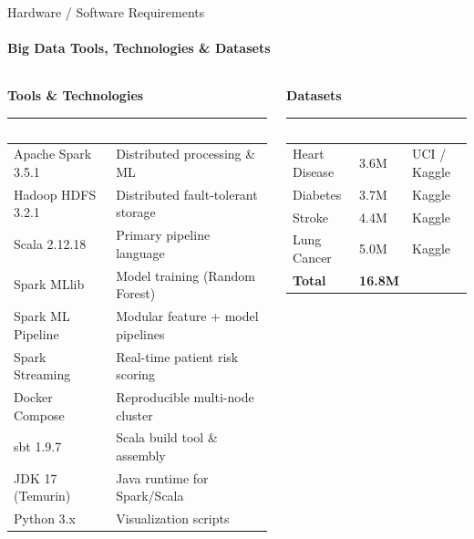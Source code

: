 \documentclass[aspectratio=169, 11pt]{beamer}
\begin{document}
\begin{frame}{Hardware / Software Requirements}
\framesubtitle{Big Data Tools, Technologies \& Datasets}

\vspace{0.15cm}
\begin{columns}[T]
\begin{column}{0.52\textwidth}
  {\small\textbf{\textcolor{msNavy}{Tools \& Technologies}}}

  \vspace{0.15cm}
  \renewcommand{\arraystretch}{1.2}
  {\scriptsize
  \begin{tabular}{@{} L{2.6cm} L{3.8cm} @{}}
    \toprule
    \textcolor{white}{\textbf{Tool}} & \textcolor{white}{\textbf{Purpose}} \\
    \midrule
    Apache Spark 3.5.1  & Distributed processing \& ML \\
    Hadoop HDFS 3.2.1   & Distributed fault-tolerant storage \\
    Scala 2.12.18       & Primary pipeline language \\
    Spark MLlib         & Model training (Random Forest) \\
    Spark ML Pipeline   & Modular feature + model pipelines \\
    Spark Streaming     & Real-time patient risk scoring \\
    Docker Compose      & Reproducible multi-node cluster \\
    sbt 1.9.7           & Scala build tool \& assembly \\
    JDK 17 (Temurin)    & Java runtime for Spark/Scala \\
    Python 3.x          & Visualization scripts \\
    \bottomrule
  \end{tabular}
  }
\end{column}

\begin{column}{0.45\textwidth}
  {\small\textbf{\textcolor{msNavy}{Datasets}}}

  \vspace{0.15cm}
  \renewcommand{\arraystretch}{1.2}
  {\scriptsize
  \begin{tabular}{@{} L{2.2cm} C{1.0cm} L{1.5cm} @{}}
    \toprule
    \textcolor{white}{\textbf{Dataset}} & \textcolor{white}{\textbf{Rows}} & \textcolor{white}{\textbf{Source}} \\
    \midrule
    Heart Disease   & 3.6M  & UCI / Kaggle \\
    Diabetes        & 3.7M  & Kaggle \\
    Stroke          & 4.4M  & Kaggle \\
    Lung Cancer     & 5.0M  & Kaggle \\
    \midrule
    \textbf{Total}  & \textbf{16.8M} & \\
    \bottomrule
  \end{tabular}
  }


\end{column}
\end{columns}
\end{frame}
\end{document}
